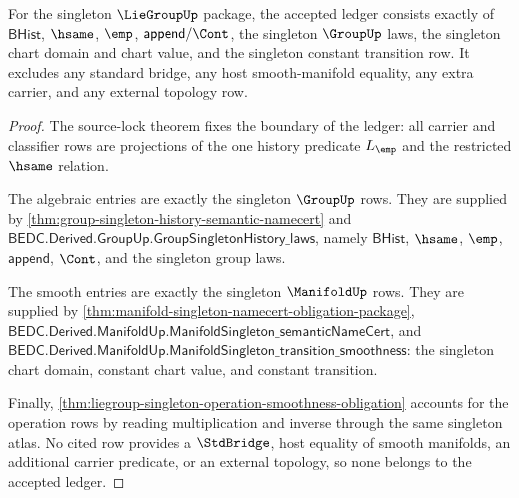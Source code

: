 \begin{theorem}
\label{thm:liegroup-singleton-exact-ledger}
For the singleton $\LieGroupUp$ package, the accepted ledger consists exactly
of $\mathsf{BHist}$, $\hsame$, $\emp$, $\mathsf{append}/\Cont$, the singleton
$\GroupUp$ laws, the singleton chart domain and chart value, and the
singleton constant transition row. It excludes any standard bridge, any host
smooth-manifold equality, any extra carrier, and any external topology row.
\end{theorem}
\begin{proof}
The source-lock theorem fixes the boundary of the ledger: all carrier and
classifier rows are projections of the one history predicate $L_{\emp}$ and
the restricted $\hsame$ relation.

The algebraic entries are exactly the singleton $\GroupUp$ rows. They are
supplied by \autoref{thm:group-singleton-history-semantic-namecert} and
$\mathsf{BEDC.Derived.GroupUp.GroupSingletonHistory\_laws}$, namely
$\mathsf{BHist}$, $\hsame$, $\emp$, $\mathsf{append}$, $\Cont$, and the
singleton group laws.

The smooth entries are exactly the singleton $\ManifoldUp$ rows. They are
supplied by \autoref{thm:manifold-singleton-namecert-obligation-package},
$\mathsf{BEDC.Derived.ManifoldUp.ManifoldSingleton\_semanticNameCert}$, and
$\mathsf{BEDC.Derived.ManifoldUp.ManifoldSingleton\_transition\_smoothness}$:
the singleton chart domain, constant chart value, and constant transition.

Finally,
\autoref{thm:liegroup-singleton-operation-smoothness-obligation} accounts for
the operation rows by reading multiplication and inverse through the same
singleton atlas. No cited row provides a $\StdBridge$, host equality of smooth
manifolds, an additional carrier predicate, or an external topology, so none
belongs to the accepted ledger.
\end{proof}

